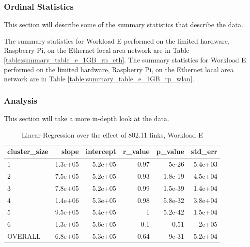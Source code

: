\subsubsection{Ordinal Statistics}
This section will describe some of the summary statistics that describe the data.  

The summary statistics for Workload E performed on the limited hardware, Raspberry Pi, on the Ethernet local area network are in Table \ref{table:summary_table_e_1GB_rp_eth}.
The summary statistics for Workload E performed on the limited hardware, Raspberry Pi, on the Ethernet local area network are in Table \ref{table:summary_table_e_1GB_rp_wlan}.



\subsubsection{Analysis}
This section will take a more in-depth look at the data.




\begin{table}[H]
\centering
\begin{tabular}{lrrrrr}
\toprule
cluster\_size &   slope &  intercept &  r\_value &  p\_value &  std\_err \\
\midrule
           1 & 1.3e+05 &    5.2e+05 &     0.97 &    5e-26 &  5.4e+03 \\
           2 & 7.5e+05 &    5.2e+05 &     0.93 &  1.8e-19 &  4.5e+04 \\
           3 & 7.8e+05 &    5.2e+05 &     0.99 &  1.5e-39 &  1.4e+04 \\
           4 & 1.4e+06 &    5.3e+05 &     0.98 &  5.8e-32 &  3.8e+04 \\
           5 & 9.5e+05 &    5.4e+05 &        1 &  5.2e-42 &  1.5e+04 \\
           6 & 1.3e+05 &    5.6e+05 &      0.1 &     0.51 &    2e+05 \\
     OVERALL & 6.8e+05 &    5.3e+05 &     0.64 &    9e-31 &  5.2e+04 \\
\bottomrule
\end{tabular}
\caption{Linear Regression over the effect of 802.11 links, Workload E}
\label{table:wlan_v_eth_e}
\end{table}






